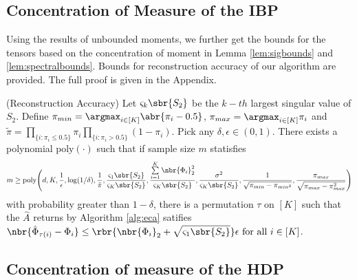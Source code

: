 \documentclass[twoside,11pt]{article}
\begin{document}
{\subsection{Concentration of Measure of the IBP}
Using the results of unbounded moments, we further get the bounds for the tensors based on the concentration of
moment in Lemma \ref{lem:sigbounds} and
\ref{lem:spectralbounds}. Bounds for reconstruction accuracy of our
algorithm are provided. The full proof is given in the Appendix.
\begin{theorem}{(Reconstruction Accuracy)}
  \label{th:reconstruction} Let $\varsigma_k \sbr{S_2}$ be the $k-th$ largest singular value of $S_2$. Define  $\pi_{min} = \argmax_{i \in [K]} \abr{\pi_i - 0.5}$, $\pi_{max} = \argmax_{i \in [K]}  \pi_i$ and $\tilde{\pi} = \prod_{\{i:\pi_i \leq 0.5\}} \pi_i \prod_{\{i:\pi_i > 0.5\}} (1-\pi_i)$.  Pick any $\delta, \epsilon \in (0,1)$. There exists a polynomial $\mathrm{poly}(\cdot)$ such that if sample size $m$ statisfies 
\begin{align*}
  m \geq \mathrm{poly}\Biggl({d, K, \frac{1}{\epsilon}, \log(1/\delta), \frac{1}{\tilde{\pi}},\frac{ \varsigma_1\sbr{S_2}}{ \varsigma_K\sbr{S_2}}, \frac{\sum \limits_{i=1}^K \nbr{\Phi_i}_2^2}{  \varsigma_K\sbr{S_2} }, \frac{\sigma^2}{  \varsigma_K\sbr{S_2}},\frac{1}{\sqrt{\pi_{min}-\pi_{min^2}}}, \frac{\pi_{max}}{\sqrt{\pi_{max}-\pi_{max}^2 }}}\Biggr)
\end{align*}
with probability greater than $1-\delta$, there is a permutation $\tau$ on $[K]$ such that the $\hat{A}$ returns by Algorithm \ref{alg:eca} satifies
$\displaystyle
    \nbr{\hat{\Phi}_{\tau(i)} - \Phi_i} \leq \rbr{\nbr{\Phi_i}_2 + \sqrt{ \varsigma_1 \sbr{S_2}}}\epsilon
    \text{ for all } i \in [K]$.
\end{theorem}
\subsection{Concentration of measure of the HDP}
%
\label{sec:conc}

}
\end{document}

